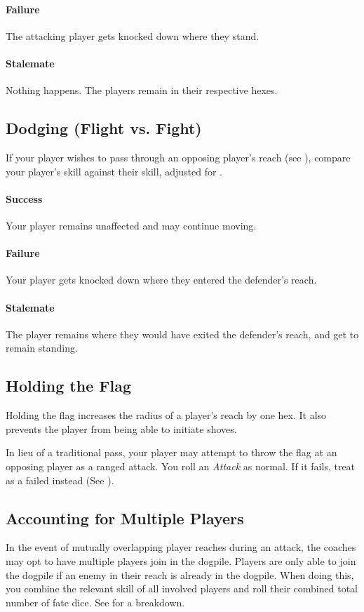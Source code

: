 \paragraph{Failure}
The attacking player gets knocked down where they stand.
\paragraph{Stalemate}
Nothing happens.
The players remain in their respective hexes.

\subsection{Dodging (Flight vs. Fight)}
If your player wishes to pass through an opposing player's reach (see ), compare your player's \flight{} skill against their \fight{} skill, adjusted for \fate{}.

\paragraph{Success}
Your player remains unaffected and may continue moving.
\paragraph{Failure}
Your player gets knocked down where they entered the defender's reach.
\paragraph{Stalemate}
The player remains where they would have exited the defender's reach, and get to remain standing.

\subsection{Holding the Flag}
Holding the flag increases the radius of a player's reach by one hex.
It also prevents the player from being able to initiate shoves.

In lieu of a traditional pass, your player may attempt to throw the flag at an opposing player as a ranged attack.
You roll an \textit{Attack} as normal.
If it fails, treat as a failed \throw{} instead (See ).

\subsection{Accounting for Multiple Players}\label{dogpiling}
In the event of mutually overlapping player reaches during an attack, the coaches may opt to have multiple players join in the dogpile.
Players are only able to join the dogpile if an enemy in their reach is already in the dogpile.
When doing this, you combine the relevant skill of all involved players and roll their combined total number of fate dice. 
See  for a breakdown.

